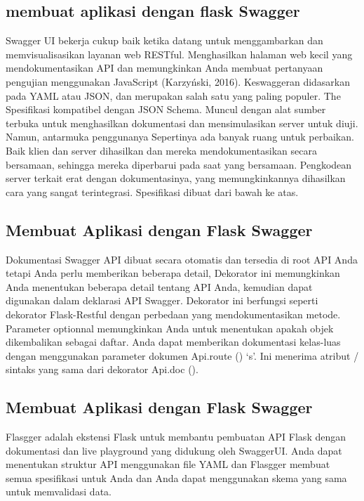 \documentclass[12pt]{article}
\begin{document}
\subsection{membuat aplikasi dengan flask Swagger }
Swagger UI bekerja cukup baik ketika datang untuk menggambarkan dan memvisualisasikan layanan web RESTful. Menghasilkan halaman web kecil yang mendokumentasikan API dan memungkinkan Anda membuat pertanyaan pengujian menggunakan JavaScript (Karzyński, 2016). Keswaggeran didasarkan pada YAML atau JSON, dan merupakan salah satu yang paling populer. The Spesifikasi kompatibel dengan JSON Schema. Muncul dengan alat sumber terbuka untuk menghasilkan dokumentasi dan mensimulasikan server untuk diuji. Namun, antarmuka penggunanya Sepertinya ada banyak ruang untuk perbaikan. Baik klien dan server dihasilkan dan mereka mendokumentasikan secara bersamaan, sehingga mereka diperbarui pada saat yang bersamaan. Pengkodean server terkait erat dengan dokumentasinya, yang memungkinkannya dihasilkan cara yang sangat terintegrasi. Spesifikasi dibuat dari bawah ke atas\cite{ortegacatalogo}.

\subsection{Membuat Aplikasi dengan Flask Swagger}
Dokumentasi Swagger API dibuat secara otomatis dan tersedia di root API Anda tetapi Anda perlu memberikan beberapa detail, Dekorator ini memungkinkan Anda menentukan beberapa detail tentang API Anda, kemudian dapat digunakan dalam deklarasi API Swagger. Dekorator ini berfungsi seperti dekorator Flask-Restful dengan perbedaan yang mendokumentasikan metode. Parameter optionnal memungkinkan Anda untuk menentukan apakah objek dikembalikan sebagai daftar. Anda dapat memberikan dokumentasi kelas-luas dengan menggunakan parameter dokumen Api.route () ‘s’. Ini menerima atribut / sintaks yang sama dari dekorator Api.doc ()\cite{de2017api}.

\subsection{Membuat Aplikasi dengan Flask Swagger}
Flasgger adalah ekstensi Flask untuk membantu pembuatan API Flask dengan dokumentasi dan live playground yang didukung oleh SwaggerUI. Anda dapat menentukan struktur API menggunakan file YAML dan Flasgger membuat semua spesifikasi untuk Anda dan Anda dapat menggunakan skema yang sama untuk memvalidasi data.
\end{document}
